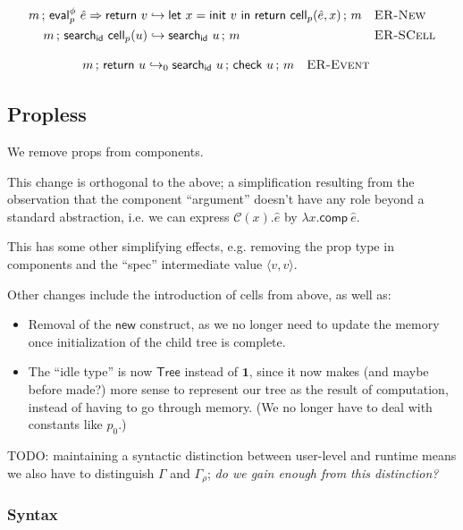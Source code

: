 \documentclass{article}
\newcommand{\mf}[1]{\mathsf{#1}}
\newcommand{\mc}[1]{\mathcal{#1}}
\newcommand{\mb}[1]{\mathbf{#1}}
\newcommand{\ts}[1]{\textsc{#1}}
\newcommand{\semi}{\,;\,}
\newcommand{\hl}[1]{\colorbox{LightGoldenrod1}{#1}}
\newcommand{\pair}[2]{\langle #1, #2 \rangle}
\newcommand{\tone}{\mb{1}}
\newcommand{\ttree}{\mf{Tree}}
\newcommand{\C}{\mc{C}}
\newcommand{\elet}[3]{\mf{let}\ #1 = #2\ \mf{in}\ #3}
\newcommand{\eret}[1]{\mf{return}\ #1}
\newcommand{\esearch}[2]{\mf{search}_\mf{#1}\ #2}
\newcommand{\eeval}[3]{\mf{eval}^{#1}_{#2}\ #3}
\newcommand{\einit}[1]{\mf{init}\ #1}
\newcommand{\echk}[1]{\mf{check}\ #1}
\begin{document}
\begin{align*}
m \semi \eeval{\phi}{p}{\hat{e} \Rightarrow \eret{v}}
&\hookrightarrow
\elet{x}{\einit{v}}{\eret{\mf{cell}_p(\hat{e}, x)}} \semi m
&&\ts{ER-New}\\
m \semi \esearch{id}{\mf{cell}_p(u)}
&\hookrightarrow
\esearch{id}{u} \semi m
&&\ts{ER-SCell}
\end{align*}

\begin{align*}
m \semi \eret{u} 
&\hookrightarrow_0
\esearch{id}{u} \semi \echk{u} \semi m
&&\ts{ER-Event}
\end{align*}

\subsection{Propless}

We remove props from components.

This change is orthogonal to the above; a simplification resulting
from the observation that the component ``argument''
doesn't have any role beyond a standard abstraction,
i.e. we can express $\C(x).\hat{e}$ 
by $\lambda x.\mf{comp}\ \hat{e}$.

This has some other simplifying effects,
e.g. removing the prop type in components
and the ``spec'' intermediate value $\pair{v}{v}$.

Other changes include the introduction of cells from above,
as well as:
\begin{itemize}
\item Removal of the $\mf{new}$ construct,
as we no longer need to update the memory once
initialization of the child tree is complete.
\item The ``idle type'' is now $\ttree$ instead of $\tone$,
since it now makes (and maybe before made?) more sense 
to represent our tree as the result of computation,
instead of having to go through memory.
(We no longer have to deal with constants like $p_0$.)
\end{itemize}

\hl{TODO}: maintaining a syntactic distinction between user-level and runtime
means we also have to distinguish $\Gamma$ and $\Gamma_\rho$;
\emph{do we gain enough from this distinction?}

\subsubsection{Syntax}
\end{document}
